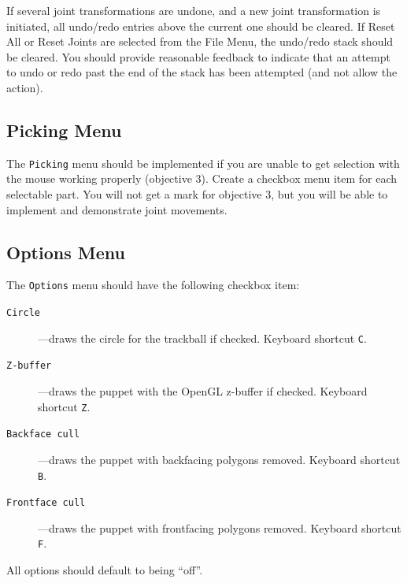 If several joint transformations are undone, and a new joint transformation
is initiated, all undo/redo entries above the current one should be
cleared.  If Reset All or Reset Joints are selected from the File Menu,
the undo/redo stack should be cleared.  You should provide reasonable
feedback to indicate that an attempt to undo or redo past the end
of the stack has been attempted (and not allow the action).


\subsection{Picking Menu}

The {\tt Picking} menu should be implemented if you are unable to get
selection with the mouse working properly (objective 3).  Create a 
checkbox menu item for each selectable part.  You will not get a mark 
for objective 3, but you will be able to implement and demonstrate 
joint movements.


\subsection{Options Menu}
The {\tt Options} menu should have the following checkbox item:
\begin{description}
	\item[{\tt Circle}]---draws the circle for the trackball if checked.
		Keyboard shortcut  \texttt{C}.
	\item[{\tt Z-buffer}]---draws the puppet with the OpenGL z-buffer
		if checked.
		Keyboard shortcut  \texttt{Z}.
	\item[{\tt Backface cull}]---draws the puppet with backfacing
		polygons removed.
		Keyboard shortcut  \texttt{B}.
	\item[{\tt Frontface cull}]---draws the puppet with frontfacing
		polygons removed.
		Keyboard shortcut  \texttt{F}.
\end{description}
All options should default to being ``off''.

